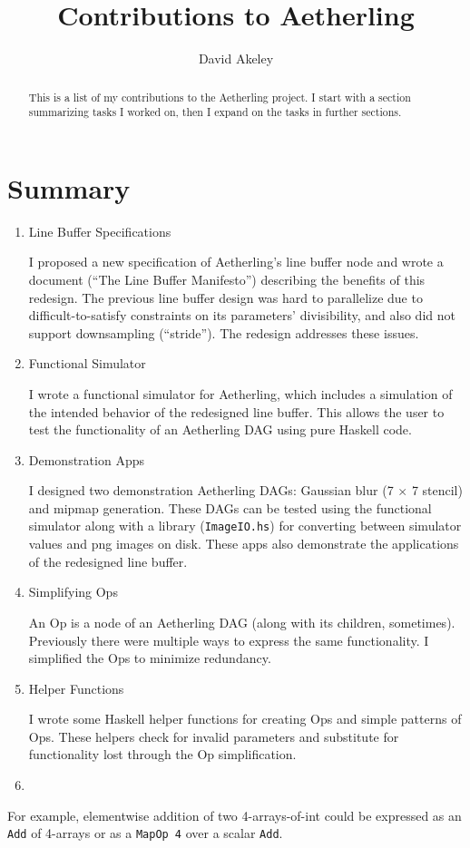 \documentclass[11pt]{article}
\begin{document}
\title{Contributions to Aetherling}
\author{David Akeley}
\maketitle

\begin{abstract}
This is a list of my contributions to the Aetherling project. I start
with a section summarizing tasks I worked on, then I expand on the
tasks in further sections.
\end{abstract}

\section{Summary}

\begin{enumerate}

\item Line Buffer Specifications

I proposed a new specification of Aetherling's line buffer node and
wrote a document (``The Line Buffer Manifesto'') describing the
benefits of this redesign. The previous line buffer design was hard to
parallelize due to difficult-to-satisfy constraints on its parameters'
divisibility, and also did not support downsampling (``stride'').
The redesign addresses these issues.

\item Functional Simulator

I wrote a functional simulator for Aetherling, which includes a
simulation of the intended behavior of the redesigned line
buffer. This allows the user to test the functionality of an
Aetherling DAG using pure Haskell code.

\item Demonstration Apps

I designed two demonstration Aetherling DAGs: Gaussian blur (7 $\times$
7 stencil) and mipmap generation. These DAGs can be tested using the
functional simulator along with a library (\texttt{ImageIO.hs}) for
converting between simulator values and png images on disk. These apps
also demonstrate the applications of the redesigned line buffer.

\item Simplifying Ops

An Op is a node of an Aetherling DAG (along with its children,
sometimes). Previously there were multiple ways to express the same
functionality. I simplified the Ops to minimize redundancy.

\item Helper Functions

I wrote some Haskell helper functions for creating Ops and simple
patterns of Ops. These helpers check for invalid parameters and
substitute for functionality lost through the Op simplification.

\item 

\end{enumerate}

For example, elementwise addition of two
4-arrays-of-int could be expressed as an \texttt{Add} of 4-arrays or as
a \texttt{MapOp 4} over a scalar \texttt{Add}.
\end{document}
